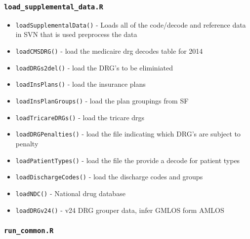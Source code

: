 \documentclass[
]{book}
\providecommand{\tightlist}{%
  \setlength{\itemsep}{0pt}\setlength{\parskip}{0pt}}
\begin{document}
\hypertarget{load_supplemental_data.r}{%
\subsubsection{\texorpdfstring{\texttt{load\_supplemental\_data.R}}{load\_supplemental\_data.R}}\label{load_supplemental_data.r}}

\begin{itemize}
\tightlist
\item
  \texttt{loadSupplementalData()} - Loads all of the code/decode and reference data in SVN that is used preprocess the data
\item
  \texttt{loadCMSDRG()} - load the medicaire drg decodes table for 2014
\item
  \texttt{loadDRGs2del()} - load the DRG's to be eliminiated
\item
  \texttt{loadInsPlans()} - load the insurance plans
\item
  \texttt{loadInsPlanGroups()} - load the plan groupings from SF
\item
  \texttt{loadTricareDRGs()} - load the tricare drgs
\item
  \texttt{loadDRGPenalties()} - load the file indicating which DRG's are subject to penalty
\item
  \texttt{loadPatientTypes()} - load the file the provide a decode for patient types
\item
  \texttt{loadDischargeCodes()} - load the discharge codes and groups
\item
  \texttt{loadNDC()} - National drug database
\item
  \texttt{loadDRGv24()} - v24 DRG grouper data, infer GMLOS form AMLOS
\end{itemize}

\hypertarget{run_common.r}{%
\subsubsection{\texorpdfstring{\texttt{run\_common.R}}{run\_common.R}}\label{run_common.r}}
\end{document}
